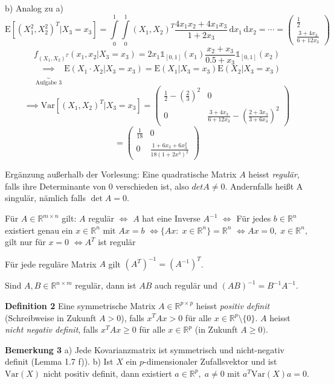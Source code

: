 \documentclass[12pt, a4paper]{article}
\newcommand{\E}{\mbox{I\negthinspace E}}
\theoremstyle{plain}
\theoremstyle{definition}
\newcommand{\R}{\mathbb{R}}
\newcommand{\1}{\mathds{1}}
\renewcommand{\E}{\mathrm{E}}
\newcommand{\Var}{\mathrm{Var}}
\renewcommand{\d}{\,\mathrm{d}}
\begin{document}
b) Analog zu a)
\[ \E[(X_1^2, X_2^2)^T | X_3 = x_3] = \int\limits_0^1 \int\limits_0^1  (X_1, X_2)^T \frac{4x_1 x_2 + 4 x_1 x_3}{1 + 2 x_3} \d x_1 \d x_2 = \cdots = \begin{pmatrix}  \frac{1}{2} \\ \frac{3 + 4x_3}{6 + 12 x_3}  \end{pmatrix}     \]
\[ f_{(X_1, X_2)^T} (x_1, x_2 | X_3 = x_3) = 2 x_1 \1_{[0,1]}(x_1) \frac{x_2 + x_3}{0.5 + x_3} \1_{[0,1]} (x_2)  \]
\[ \underbrace{\implies}_{\text{Aufgabe 3}} \E(X_1 \cdot X_2 | X_3 = x_3) = \E(X_1 | X_3 = x_3) \E(X_2 | X_3 = x_3)      \]
\[ \implies \Var[(X_1, X_2)^T | X_3 = x_3  ]  = \begin{pmatrix} \frac{1}{2} - (\frac{2}{3})^2 & 0 \\   0 &  \frac{3 + 4x_3}{6 + 12 x_3} - (\frac{2 + 3 x_3}{3 + 6x_3})^2     \end{pmatrix}  \]
\[  = \begin{pmatrix} \frac{1}{18}  & 0\\   0 &  \frac{1 + 6 x_3 + 6 x_3^2}{18(1 + 2x^3)^2}   \end{pmatrix}    \]

Ergänzung außerhalb der Vorlesung:
Eine quadratische Matrix $A$ heisst \emph{regulär}, falls ihre Determinante von 0 verschieden ist, also $det A \neq 0$. Andernfalls heißt A singulär, nämlich falls $\det A = 0$.

Für $A \in \R^{m \times n}$ gilt: $A$ regulär 
$\iff$ $A$ hat eine Inverse $A^{-1}$ 
$\iff$ Für jedes $b \in \R^{n}$ existiert genau ein $x \in \R^n$ mit $Ax = b$
$\iff \{ Ax: \; x \in \R^{n} \} = \R^n  $
$\iff Ax = 0, \; x \in \R^n, $ gilt nur für $x = 0$
$\iff A^T $ ist regulär

Für jede reguläre Matrix $A$ gilt $(A^T)^{-1} = (A^{-1})^T$.

Sind $A,B \in \R^{n \times m} $ regulär, dann ist $AB$ auch regulär und $(AB)^{-1} = B^{-1} A^{-1}$. 

\textbf{Definition 2} Eine symmetrische Matrix $A \in \R^{p \times p}$ heisst \emph{positiv definit} (Schreibweise in Zukunft $A>0$), falls $x^T A x > 0$ für alle $x \in \R^p \setminus \{0\}$. $A$ heisst \emph{nicht negativ definit}, falls $x^T A x \geq 0$ für alle $x \in \R^p$ (in Zukunft $A \geq 0)$.

\textbf{Bemerkung 3} a) Jede Kovarianzmatrix ist symmetrisch und nicht-negativ definit (Lemma 1.7 f)).
b) Ist $X$ ein $p$-dimensionaler Zufallsvektor und ist $\Var(X)$ nicht positiv definit, dann existiert $a \in \R^p, \; a \neq 0$ mit $a^T \Var(X)a = 0$.
\end{document}
